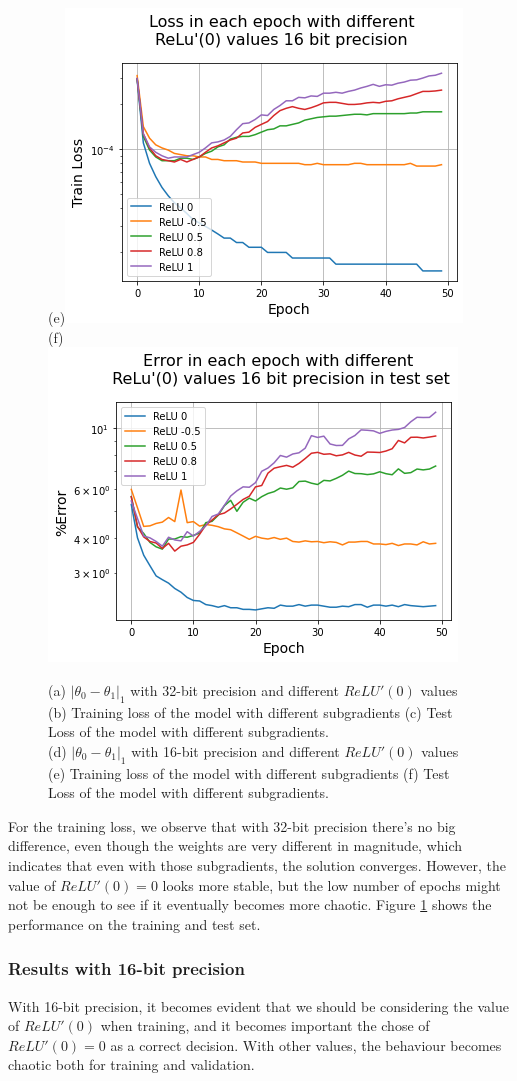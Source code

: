 \begin{figure}[hbtp]
        \subfigure(e){\includegraphics[width=0.4\columnwidth]{Images/LossTrain16.png}} 
        \subfigure(f){\includegraphics[width=0.4\columnwidth]{Images/ErrorTest16.png}}
    \caption{(a)   $|\theta_0 - \theta_1|_1$ with 32-bit precision and different $ReLU'(0)$ values (b) Training loss of the model with different subgradients  (c) Test Loss of the model with different subgradients. \\
    (d)   $|\theta_0 - \theta_1|_1$ with 16-bit precision and different $ReLU'(0)$ values (e) Training loss of the model with different subgradients  (f) Test Loss of the model with different subgradients.}
    \label{fig:validation32}
\end{figure}

For the training loss, we observe that with 32-bit precision there's no big difference, even though the weights are very different in magnitude, which indicates that even with those subgradients, the solution converges. However, the value of $ReLU'(0) = 0$ looks more stable, but the low number of epochs might not be enough to see if it eventually becomes more chaotic. Figure \ref{fig:validation32} shows the performance on the training and test set. 






\subsubsection{Results with 16-bit precision}


With 16-bit precision, it becomes evident that we should be considering the value of $ReLU'(0) $ when training, and it becomes important the chose of $ReLU'(0) = 0$ as a correct decision. With other values, the behaviour becomes chaotic both for training and validation. 

